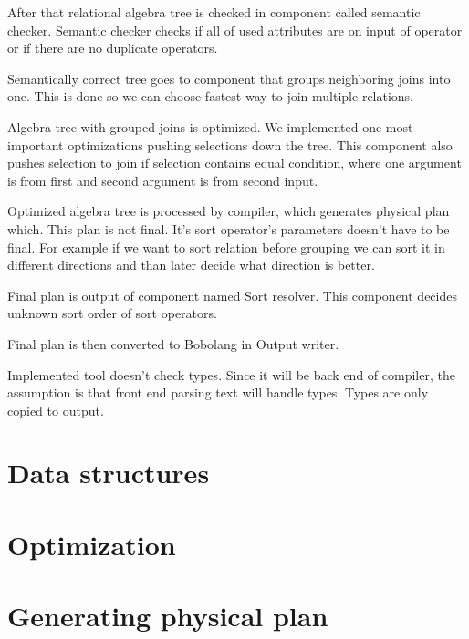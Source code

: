After that relational algebra tree is checked in component called semantic checker. Semantic checker checks if all of used attributes are on input of operator or if there are no duplicate operators. 

Semantically correct tree goes to component that groups neighboring joins into one. This is done so we can choose fastest way to join multiple relations.

Algebra tree with grouped joins is optimized. We implemented one most important optimizations pushing selections down the tree. This component also pushes selection to join if selection contains equal condition, where one argument is from first and second argument is from second input.

Optimized algebra tree is processed by compiler, which generates physical plan which. This plan is not final. It's sort operator's parameters doesn't have to be final. For example if we want to sort relation before grouping we can sort it in different directions and than later decide what direction is better.

Final plan is output of component named Sort resolver. This component decides unknown sort order of sort operators.

Final plan is then converted to Bobolang in Output writer.

Implemented tool doesn't check types. Since it will be back end of compiler, the assumption is that front end parsing text will handle types. Types are only copied to output.

\section{Data structures}

\section{Optimization}

\section{Generating physical plan}




